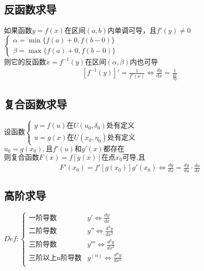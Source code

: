\subsection{反函数求导}
如果函数$y=f(x)$在区间$(a,b)$内单调可导，且$f'(y)\neq 0$\\
$\begin{cases}
  \alpha=\min\{f(a)+0,f(b-0)\}\\
  \beta=\max\{f(a)+0,f(b-0)\}
\end{cases}$\\
则它的反函数$x=f^{-1}(y)$在区间$(\alpha,\beta)$内也可导
\begin{align}
  \left[f^{-1}(y)\right]'=\frac{1}{f'(x)}\Leftrightarrow \frac{dy}{\mathrm{d}{x}}=\frac{1}{\frac{dx}{\mathrm{d}{y}}} \label{derivative_of_inverse_function}
\end{align}
\subsection{复合函数求导}
\begin{center}
  设函数$\begin{cases}
    y=f(u)\mbox{在}U(u_0,\delta_0)\mbox{处有定义}\\
    u=g(x)\mbox{在}U(x_0,\eta_0)\mbox{处有定义}
  \end{cases}$\\
  $u_0=g(x_0),\mbox{且}f'(u)\mbox{和}g'(x)\mbox{都存在}$\\
  $\mbox{则复合函数}F(x)=f\left[g(x)\right]\mbox{在点}x_0\mbox{可导,且}$
  \begin{align}
    F'(x_0)=f'\left[g(x_0)\right]g'(x_0)\Leftrightarrow \frac{dy}{dx}=\frac{dy}{du}\cdot\frac{du}{dx}\label{derivative_of_composite_functions}
  \end{align}
\end{center}
\subsection{高阶求导}
$Def:\begin{cases}
  \mbox{一阶导数} &y'\Leftrightarrow \frac{dy}{dx}\\
  \mbox{二阶导数}&y''\Leftrightarrow \frac{d^2y}{dx^2}\\
  \mbox{三阶导数}&y'''\Leftrightarrow \frac{d^3y}{dx^3}\\
  \mbox{三阶以上n阶导数}&y^{(n)}\Leftrightarrow \frac{d^ny}{dx^n}\\
\end{cases}$
